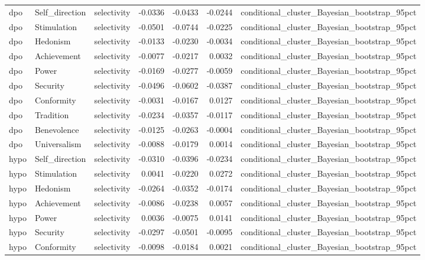 \begin{tabular}{lllrrrl}
dpo & Self\_direction & selectivity & -0.0336 & -0.0433 & -0.0244 & conditional\_cluster\_Bayesian\_bootstrap\_95pct \\
dpo & Stimulation & selectivity & -0.0501 & -0.0744 & -0.0225 & conditional\_cluster\_Bayesian\_bootstrap\_95pct \\
dpo & Hedonism & selectivity & -0.0133 & -0.0230 & -0.0034 & conditional\_cluster\_Bayesian\_bootstrap\_95pct \\
dpo & Achievement & selectivity & -0.0077 & -0.0217 & 0.0032 & conditional\_cluster\_Bayesian\_bootstrap\_95pct \\
dpo & Power & selectivity & -0.0169 & -0.0277 & -0.0059 & conditional\_cluster\_Bayesian\_bootstrap\_95pct \\
dpo & Security & selectivity & -0.0496 & -0.0602 & -0.0387 & conditional\_cluster\_Bayesian\_bootstrap\_95pct \\
dpo & Conformity & selectivity & -0.0031 & -0.0167 & 0.0127 & conditional\_cluster\_Bayesian\_bootstrap\_95pct \\
dpo & Tradition & selectivity & -0.0234 & -0.0357 & -0.0117 & conditional\_cluster\_Bayesian\_bootstrap\_95pct \\
dpo & Benevolence & selectivity & -0.0125 & -0.0263 & -0.0004 & conditional\_cluster\_Bayesian\_bootstrap\_95pct \\
dpo & Universalism & selectivity & -0.0088 & -0.0179 & 0.0014 & conditional\_cluster\_Bayesian\_bootstrap\_95pct \\
hypo & Self\_direction & selectivity & -0.0310 & -0.0396 & -0.0234 & conditional\_cluster\_Bayesian\_bootstrap\_95pct \\
hypo & Stimulation & selectivity & 0.0041 & -0.0220 & 0.0272 & conditional\_cluster\_Bayesian\_bootstrap\_95pct \\
hypo & Hedonism & selectivity & -0.0264 & -0.0352 & -0.0174 & conditional\_cluster\_Bayesian\_bootstrap\_95pct \\
hypo & Achievement & selectivity & -0.0086 & -0.0238 & 0.0057 & conditional\_cluster\_Bayesian\_bootstrap\_95pct \\
hypo & Power & selectivity & 0.0036 & -0.0075 & 0.0141 & conditional\_cluster\_Bayesian\_bootstrap\_95pct \\
hypo & Security & selectivity & -0.0297 & -0.0501 & -0.0095 & conditional\_cluster\_Bayesian\_bootstrap\_95pct \\
hypo & Conformity & selectivity & -0.0098 & -0.0184 & 0.0021 & conditional\_cluster\_Bayesian\_bootstrap\_95pct \\

\end{tabular}
